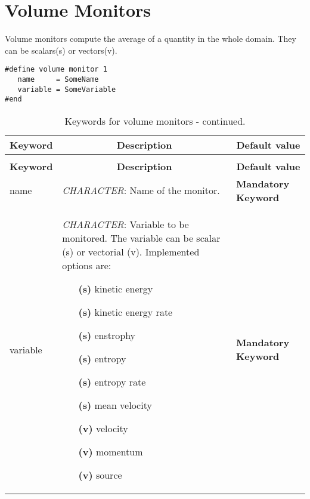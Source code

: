 \documentclass[a4paper,10pt]{report}
\begin{document}
\section{Volume Monitors}
Volume monitors compute the average of a quantity in the whole domain. They can be scalars(s) or vectors(v).

\begin{lstlisting}
#define volume monitor 1
   name     = SomeName
   variable = SomeVariable
#end
\end{lstlisting}

\begin{longtable}{|p{4cm}|p{10cm}|p{2.2cm}|}
\caption{Keywords for volume monitors.} \label{tab:VolMonitorsKey} \\
\hline
\multicolumn{1}{|c|}{\textbf{Keyword}} & \multicolumn{1}{c|}{\textbf{Description}} & \multicolumn{1}{c|}{\textbf{Default value}} \\ \hline
\endfirsthead

\caption{Keywords for volume monitors - continued.} \\
\hline
\multicolumn{1}{|c|}{\textbf{Keyword}} & \multicolumn{1}{c|}{\textbf{Description}} & \multicolumn{1}{c|}{\textbf{Default value}} \\ \hline
\endhead

name 	&
			\textit{CHARACTER}: Name of the monitor. &
							\textbf{Mandatory Keyword} \\ \hline

variable 	&
			\textit{CHARACTER}: Variable to be monitored. The variable can be scalar (s) or vectorial (v). Implemented options are:\
\begin{multicols}{2}
\begin{itemize}
\item[\textbf{(s)}] kinetic energy
\item[\textbf{(s)}] kinetic energy rate
\item[\textbf{(s)}] enstrophy
\item[\textbf{(s)}] entropy
\item[\textbf{(s)}] entropy rate
\item[\textbf{(s)}] mean velocity
\item[\textbf{(v)}] velocity
\item[\textbf{(v)}] momentum
\item[\textbf{(v)}] source
\end{itemize}
\end{multicols}

			 &
							\textbf{Mandatory Keyword} \\ \hline


\end{longtable}
\end{document}
